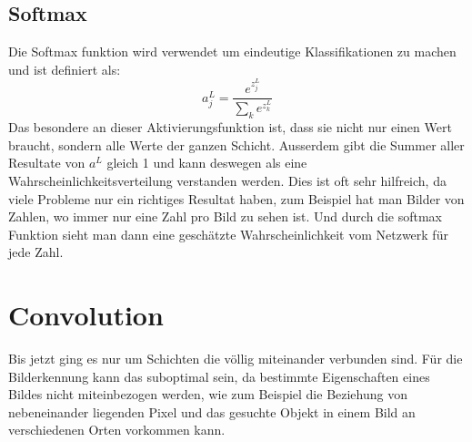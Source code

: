 \documentclass[12pt,a4paper]{report}
\begin{document}
\subsection{Softmax}
Die Softmax funktion wird verwendet um eindeutige Klassifikationen zu machen und ist definiert als:
\[a^L_j = \frac{e^{z^L_j}}{\sum_k{e^{z^L_k}}}\]
Das besondere an dieser Aktivierungsfunktion ist, dass sie nicht nur einen Wert braucht, sondern alle Werte der ganzen Schicht.
Ausserdem gibt die Summer aller Resultate von $a^L$ gleich 1 und kann deswegen als eine Wahrscheinlichkeitsverteilung verstanden werden.
Dies ist oft sehr hilfreich, da viele Probleme nur ein richtiges Resultat haben, zum Beispiel hat man Bilder von Zahlen,
wo immer nur eine Zahl pro Bild zu sehen ist.
Und durch die softmax Funktion sieht man dann eine geschätzte Wahrscheinlichkeit vom Netzwerk für jede Zahl.
\section{Convolution}
Bis jetzt ging es nur um Schichten die völlig miteinander verbunden sind.
Für die Bilderkennung kann das suboptimal sein, da bestimmte Eigenschaften eines Bildes nicht miteinbezogen werden,
wie zum Beispiel die Beziehung von nebeneinander liegenden Pixel
und das gesuchte Objekt in einem Bild an verschiedenen Orten vorkommen kann.
\end{document}
